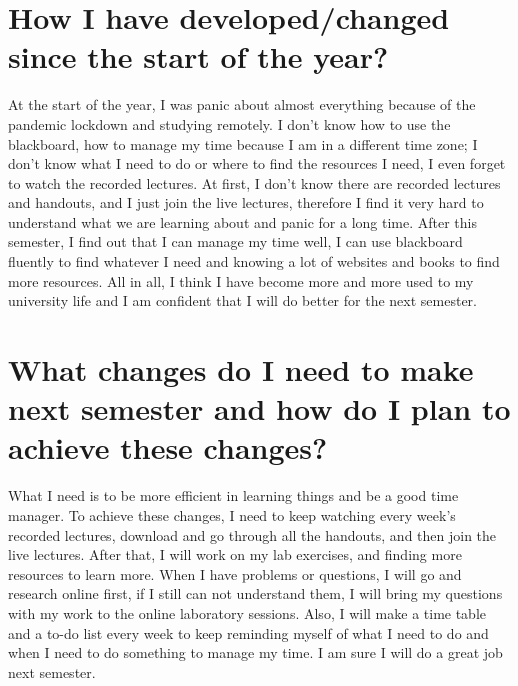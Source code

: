 \documentclass[a4paper]{article}
\begin{document}
\section{How I have developed/changed since the start of the year?}
At the start of the year, I was panic about almost everything because of the pandemic lockdown and studying remotely. I don't know how to use the blackboard, how to manage my time because I am in a different time zone; I don't know what I need to do or where to find the resources I need, I even forget to watch the recorded lectures. At first, I don't know there are recorded lectures and handouts, and I just join the live lectures, therefore I find it very hard to understand what we are learning about and panic for a long time. After this semester, I find out that I can manage my time well, I can use blackboard fluently to find whatever I need and knowing a lot of websites and books to find more resources. All in all, I think I have become more and more used to my university life and I am confident that I will do better for the next semester.

\section{What changes do I need to make next semester and how do I plan to achieve these changes?}
What I need is to be more efficient in learning things and be a good time manager. To achieve these changes, I need to keep watching every week's recorded lectures, download and go through all the handouts, and then join the live lectures. After that, I will work on my lab exercises, and finding more resources to learn more. When I have problems or questions, I will go and research online first, if I still can not understand them, I will bring my questions with my work to the online laboratory sessions. Also, I will make a time table and a to-do list every week to keep reminding myself of what I need to do and when I need to do something to manage my time. I am sure I will do a great job next semester.
\end{document}
